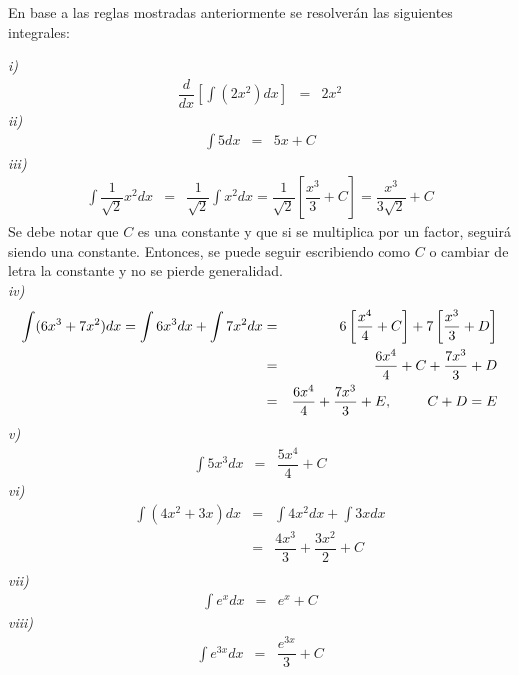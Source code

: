 \begin{myexample}
En base a las reglas mostradas anteriormente se resolverán las siguientes integrales:
\end{myexample}
\noindent\textit{i)}
\begin{eqnarray*}
\dfrac{d}{dx}\left[ \int  (2x^{2})dx \right]&=& 2x^{2}
\end{eqnarray*} 
 \noindent\textit{ii)}
\begin{eqnarray*}
 \int 5dx &=& 5x + C
\end{eqnarray*} 
\noindent\textit{iii)}
\begin{eqnarray*}
 \int \dfrac{1}{\sqrt{2}}x^{2} dx &=&   \dfrac{1}{\sqrt{2}}\int x^{2}dx = \dfrac{1}{\sqrt{2}} \left[\dfrac{x^{3}}{3}+C \right]= \dfrac{x^{3}}{3\sqrt{2}} +C
\end{eqnarray*}
Se debe notar que $C$ es una constante y que si se multiplica por un factor, seguirá siendo una constante. Entonces, se puede seguir escribiendo como $C$ o cambiar de letra la constante y no se pierde generalidad.\\ 
\noindent\textit{iv)}
\begin{eqnarray*}
 \int (6x^{3}+7x^{2})dx = \int 6x^{3}dx+\int 7x^{2}dx &=& 6\left[\dfrac{x^{4}}{4}+C \right]+7\left[\dfrac{x^{3}}{3}+D\right]\\
&=& \dfrac{6x^{4}}{4}+C+\dfrac{7x^{3}}{3}+D \\
&=& \dfrac{6x^{4}}{4}+\dfrac{7x^{3}}{3}+E, \hspace{25px} C+D=E
\end{eqnarray*} 
\noindent\textit{v)}
\begin{eqnarray*}
 \int 5x^{3}dx &=& \dfrac{5x^{4}}{4} + C
\end{eqnarray*} 
\noindent\textit{vi)}
\begin{eqnarray*}
 \int (4x^{2}+3x)dx &=&  \int 4x^{2}dx+\int 3xdx\\
 &=&  \dfrac{4x^{3}}{3}+\dfrac{3x^{2}}{2}+C \\
\end{eqnarray*} 
\noindent\textit{vii)}
\begin{eqnarray*}
 \int e^{x}dx &=&  e^{x} + C
\end{eqnarray*} 
\noindent\textit{viii)}
\begin{eqnarray*}
 \int e^{3x}dx &=&  \dfrac{e^{3x}}{3} + C
\end{eqnarray*} 

